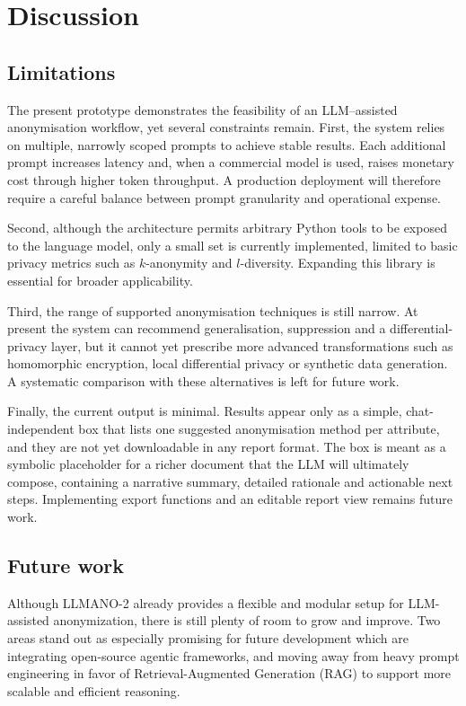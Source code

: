 \documentclass{article}
\begin{document}
\newpage

\section{Discussion}
\subsection{Limitations}
\label{sec:limitations}

The present prototype demonstrates the feasibility of an LLM–assisted anonymisation workflow, yet several constraints remain.  
First, the system relies on multiple, narrowly scoped prompts to achieve stable results.  Each additional prompt increases latency and, when a commercial model is used, raises monetary cost through higher token throughput.  A production deployment will therefore require a careful balance between prompt granularity and operational expense.  

Second, although the architecture permits arbitrary Python tools to be exposed to the language model, only a small set is currently implemented, limited to basic privacy metrics such as $k$-anonymity and $l$-diversity.  Expanding this library is essential for broader applicability.  

Third, the range of supported anonymisation techniques is still narrow.  At present the system can recommend generalisation, suppression and a differential-privacy layer, but it cannot yet prescribe more advanced transformations such as homomorphic encryption, local differential privacy or synthetic data generation.  A systematic comparison with these alternatives is left for future work.  

Finally, the current output is minimal.  Results appear only as a simple, chat-independent box that lists one suggested anonymisation method per attribute, and they are not yet downloadable in any report format.  The box is meant as a symbolic placeholder for a richer document that the LLM will ultimately compose, containing a narrative summary, detailed rationale and actionable next steps.  Implementing export functions and an editable report view remains future work.

\subsection{Future work}

Although LLMANO-2 already provides a flexible and modular setup for LLM-assisted anonymization, there is still plenty of room to grow and improve. Two areas stand out as especially promising for future development which are integrating open-source agentic frameworks, and moving away from heavy prompt engineering in favor of Retrieval-Augmented Generation (RAG) to support more scalable and efficient reasoning.
\end{document}
